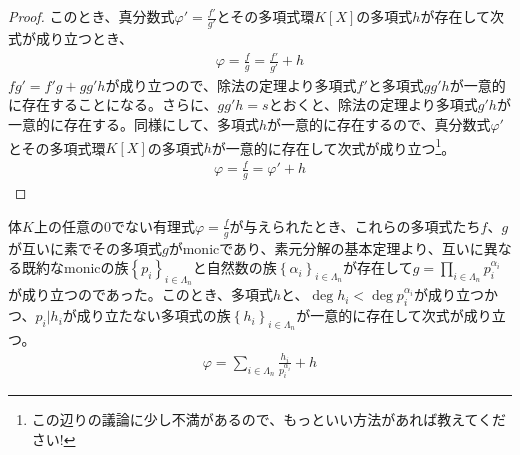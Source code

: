 \documentclass[dvipdfmx]{jsarticle}
\begin{document}
\begin{proof}
このとき、真分数式$\varphi' = \frac{f'}{g'}$とその多項式環$K[ X]$の多項式$h$が存在して次式が成り立つとき、
\begin{align*}
\varphi = \frac{f}{g} = \frac{f'}{g'} + h
\end{align*}
$fg' = f'g + gg'h$が成り立つので、除法の定理より多項式$f'$と多項式$gg'h$が一意的に存在することになる。さらに、$gg'h = s$とおくと、除法の定理より多項式$g'h$が一意的に存在する。同様にして、多項式$h$が一意的に存在するので、真分数式$\varphi'$とその多項式環$K[ X]$の多項式$h$が一意的に存在して次式が成り立つ\footnote{この辺りの議論に少し不満があるので、もっといい方法があれば教えてください!}。
\begin{align*}
\varphi = \frac{f}{g} = \varphi' + h
\end{align*}
\end{proof}
\begin{thm}\label{3.3.4.23}
体$K$上の任意の$0$でない有理式$\varphi = \frac{f}{g}$が与えられたとき、これらの多項式たち$f$、$g$が互いに素でその多項式$g$がmonicであり、素元分解の基本定理より、互いに異なる既約なmonicの族$\left\{ p_{i} \right\}_{i \in \varLambda_{n}}$と自然数の族$\left\{ \alpha_{i} \right\}_{i \in \varLambda_{n}}$が存在して$g = \prod_{i \in \varLambda_{n}} p_{i}^{\alpha_{i}}$が成り立つのであった。このとき、多項式$h$と、$\deg h_{i} < \deg p_{i}^{\alpha_{i}}$が成り立つかつ、$p_{i}|h_{i}$が成り立たない多項式の族$\left\{ h_{i} \right\}_{i \in \varLambda_{n}}$が一意的に存在して次式が成り立つ。
\begin{align*}
\varphi = \sum_{i \in \varLambda_{n}} \frac{h_{i}}{p_{i}^{\alpha_{i}}} + h
\end{align*}
\end{thm}
\end{document}
